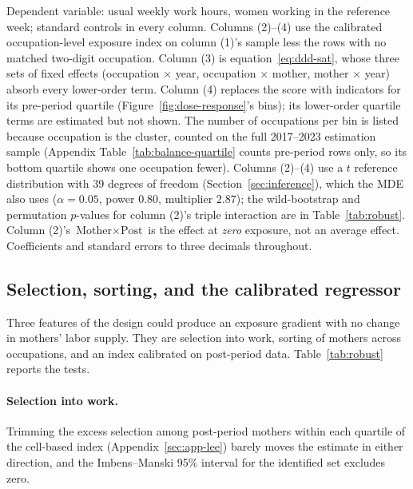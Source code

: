 \documentclass[12pt,a4paper]{article}
\newcommand{\Mother}{\text{Mother}}
\newcommand{\Post}{\text{Post}}
\begin{document}
\begin{table}[htbp]
\centering
\begin{threeparttable}
\caption{Intensive-margin DiD and DDD: weekly hours, reference-week workers}\label{tab:hours}
\renewcommand{\baselinestretch}{1}\scriptsize
\setlength{\tabcolsep}{3pt}

\begin{tablenotes}\small
\item Dependent variable: usual weekly work hours, women working in the reference week; standard
controls in every column. Columns (2)--(4) use the calibrated occupation-level exposure index on
column (1)'s sample less the rows with no matched two-digit occupation. Column (3) is
equation~\eqref{eq:ddd-sat}, whose three sets of fixed effects (occupation $\times$ year,
occupation $\times$ mother, mother $\times$ year) absorb every lower-order term. Column (4)
replaces the score with indicators for its pre-period quartile (Figure~\ref{fig:dose-response}'s
bins); its lower-order quartile terms are estimated but not shown. The number of occupations
per bin is listed because occupation is the cluster, counted on the full 2017--2023 estimation
sample (Appendix Table~\ref{tab:balance-quartile} counts pre-period rows only, so its bottom
quartile shows one occupation fewer). Columns (2)--(4) use a $t$ reference
distribution with 39 degrees of freedom (Section~\ref{sec:inference}), which the MDE also uses
($\alpha = 0.05$, power $0.80$, multiplier $2.87$); the wild-bootstrap and permutation
$p$-values for column (2)'s triple interaction are in Table~\ref{tab:robust}. Column (2)'s
$\Mother \times \Post$ is the effect at \emph{zero} exposure, not an average effect. Coefficients
and standard errors to three decimals throughout. \autonoteHours
\end{tablenotes}
\end{threeparttable}
\end{table}

\subsection{Selection, sorting, and the calibrated regressor}\label{sec:res-ddd-diag}

Three features of the design could produce an exposure gradient with no change in mothers' labor
supply. They are selection into work, sorting of mothers across occupations, and an index
calibrated on post-period data. Table~\ref{tab:robust} reports the tests.

\paragraph{Selection into work.}
Trimming the excess selection among post-period mothers within each quartile of the cell-based
index (Appendix~\ref{sec:app-lee}) barely moves the estimate in either direction, and the
Imbens--Manski 95\% interval for the identified set excludes zero.
\end{document}
